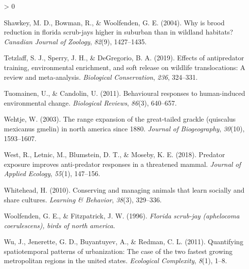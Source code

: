 \documentclass[
]{article}
\newlength{\cslhangindent}
\newenvironment{CSLReferences}[2] %
 {%
  \setlength{\parindent}{0pt}
  \ifodd #1 \everypar{\setlength{\hangindent}{\cslhangindent}}\ignorespaces\fi
  \ifnum #2 > 0
  \setlength{\parskip}{#2\baselineskip}
  \fi
 }%
 {}
\begin{document}
\begin{CSLReferences}{1}{0}
\leavevmode\hypertarget{ref-shawkey2004brood}{}%
Shawkey, M. D., Bowman, R., \& Woolfenden, G. E. (2004). Why is brood
reduction in florida scrub-jays higher in suburban than in wildland
habitats? \emph{Canadian Journal of Zoology}, \emph{82}(9), 1427--1435.

\leavevmode\hypertarget{ref-tetzlaff2019effects}{}%
Tetzlaff, S. J., Sperry, J. H., \& DeGregorio, B. A. (2019). Effects of
antipredator training, environmental enrichment, and soft release on
wildlife translocations: A review and meta-analysis. \emph{Biological
Conservation}, \emph{236}, 324--331.

\leavevmode\hypertarget{ref-tuomainen2011behavioural}{}%
Tuomainen, U., \& Candolin, U. (2011). Behavioural responses to
human-induced environmental change. \emph{Biological Reviews},
\emph{86}(3), 640--657.

\leavevmode\hypertarget{ref-wehtje2003range}{}%
Wehtje, W. (2003). The range expansion of the great-tailed grackle
(quiscalus mexicanus gmelin) in north america since 1880. \emph{Journal
of Biogeography}, \emph{30}(10), 1593--1607.

\leavevmode\hypertarget{ref-west2018predator}{}%
West, R., Letnic, M., Blumstein, D. T., \& Moseby, K. E. (2018).
Predator exposure improves anti-predator responses in a threatened
mammal. \emph{Journal of Applied Ecology}, \emph{55}(1), 147--156.

\leavevmode\hypertarget{ref-whitehead2010conserving}{}%
Whitehead, H. (2010). Conserving and managing animals that learn
socially and share cultures. \emph{Learning \& Behavior}, \emph{38}(3),
329--336.

\leavevmode\hypertarget{ref-woolfenden1996florida}{}%
Woolfenden, G. E., \& Fitzpatrick, J. W. (1996). \emph{Florida scrub-jay
(aphelocoma coerulescens), birds of north america}.

\leavevmode\hypertarget{ref-wu2011quantifying}{}%
Wu, J., Jenerette, G. D., Buyantuyev, A., \& Redman, C. L. (2011).
Quantifying spatiotemporal patterns of urbanization: The case of the two
fastest growing metropolitan regions in the united states.
\emph{Ecological Complexity}, \emph{8}(1), 1--8.

\end{CSLReferences}
\end{document}
